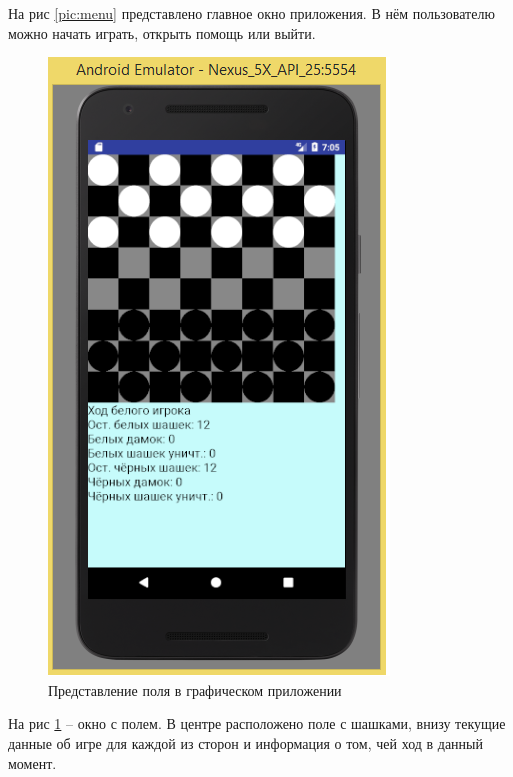 \documentclass[a4paper]{article}
\begin{document}
На рис \ref{pic:menu} представлено главное окно приложения. В нём пользователю можно начать играть, открыть помощь или выйти. 

\begin{figure}[H]
	\begin{center}
		\includegraphics[scale=0.5]{field}
		\caption{Представление поля в графическом приложении} 
		\label{pic:field} %
	\end{center}
\end{figure}

На рис \ref{pic:field} – окно с полем. В центре расположено поле с шашками, внизу текущие данные об игре для каждой из сторон и информация о том, чей ход в данный момент.
\end{document}
